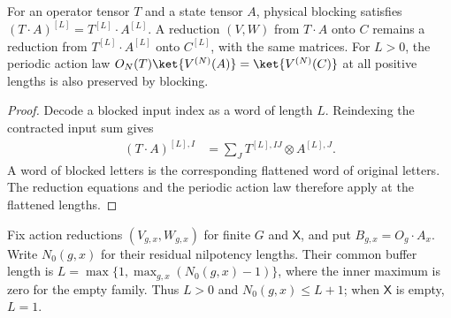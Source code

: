 \begin{lemma}
    \label{lem:mpug_action_blocking}
    \leanok
    For an operator tensor $T$ and a state tensor $A$, physical blocking
    satisfies $(T\cdot A)^{[L]}=T^{[L]}\cdot A^{[L]}$. A reduction
    $(V,W)$ from $T\cdot A$ onto $C$ remains a reduction from
    $T^{[L]}\cdot A^{[L]}$ onto $C^{[L]}$, with the same matrices.
    For $L>0$, the periodic action law
    $O_N(T)\ket{V^{(N)}(A)}=\ket{V^{(N)}(C)}$ at all positive lengths
    is also preserved by blocking.
\end{lemma}

\begin{proof}\leanok
    Decode a blocked input index as a word of length $L$. Reindexing
    the contracted input sum gives
    \begin{align}
        (T\cdot A)^{[L],I}
         & =\sum_J T^{[L],IJ}\otimes A^{[L],J}.
        \label{eq:mpug_action_blocking}
    \end{align}
    A word of blocked letters is the corresponding flattened word of
    original letters. The reduction equations and the periodic action law
    therefore apply at the flattened lengths.
\end{proof}

\begin{definition}
    \label{def:mpug_action_buffer}
    \leanok
    Fix action reductions $(V_{g,x},W_{g,x})$ for finite $G$ and
    $\mathsf X$, and put $B_{g,x}=O_g\cdot A_x$. Write $N_0(g,x)$ for
    their residual nilpotency lengths. Their common buffer length is
    $L=\max\{1,\max_{g,x}(N_0(g,x)-1)\}$, where the inner maximum is
    zero for the empty family. Thus $L>0$ and $N_0(g,x)\leq L+1$;
    when $\mathsf X$ is empty, $L=1$.
\end{definition}

